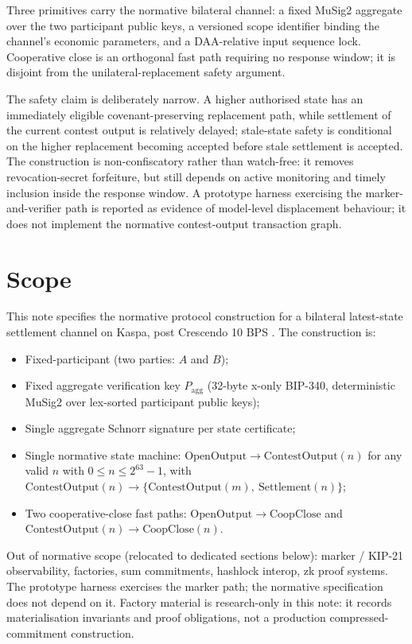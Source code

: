 \documentclass[10pt,a4paper]{article}
\begin{document}
Three primitives carry the normative bilateral channel: a fixed MuSig2 aggregate over the two participant public keys, a versioned scope identifier binding the channel's economic parameters, and a DAA-relative input sequence lock. Cooperative close is an orthogonal fast path requiring no response window; it is disjoint from the unilateral-replacement safety argument.

The safety claim is deliberately narrow. A higher authorised state has an immediately eligible covenant-preserving replacement path, while settlement of the current contest output is relatively delayed; stale-state safety is conditional on the higher replacement becoming accepted before stale settlement is accepted. The construction is non-confiscatory rather than watch-free: it removes revocation-secret forfeiture, but still depends on active monitoring and timely inclusion inside the response window. A prototype harness exercising the marker-and-verifier path is reported as evidence of model-level displacement behaviour; it does not implement the normative contest-output transaction graph.

\section{Scope}

This note specifies the normative protocol construction for a bilateral latest-state settlement channel on Kaspa, post Crescendo 10 BPS \cite{kip14}. The construction is:

\begin{itemize}
  \item Fixed-participant (two parties: $A$ and $B$);
  \item Fixed aggregate verification key $P_{\mathrm{agg}}$ (32-byte x-only BIP-340, deterministic MuSig2 over lex-sorted participant public keys);
  \item Single aggregate Schnorr signature per state certificate;
  \item Single normative state machine: $\mathrm{OpenOutput} \to \mathrm{ContestOutput}(n)$ for any valid $n$ with $0 \le n \le 2^{63}-1$, with $\mathrm{ContestOutput}(n) \to \{\mathrm{ContestOutput}(m),\ \mathrm{Settlement}(n)\}$;
  \item Two cooperative-close fast paths: $\mathrm{OpenOutput} \to \mathrm{CoopClose}$ and $\mathrm{ContestOutput}(n) \to \mathrm{CoopClose}(n)$.
\end{itemize}

Out of normative scope (relocated to dedicated sections below): marker / KIP-21 observability, factories, sum commitments, hashlock interop, zk proof systems. The prototype harness exercises the marker path; the normative specification does not depend on it. Factory material is research-only in this note: it records materialisation invariants and proof obligations, not a production compressed-commitment construction.
\end{document}
